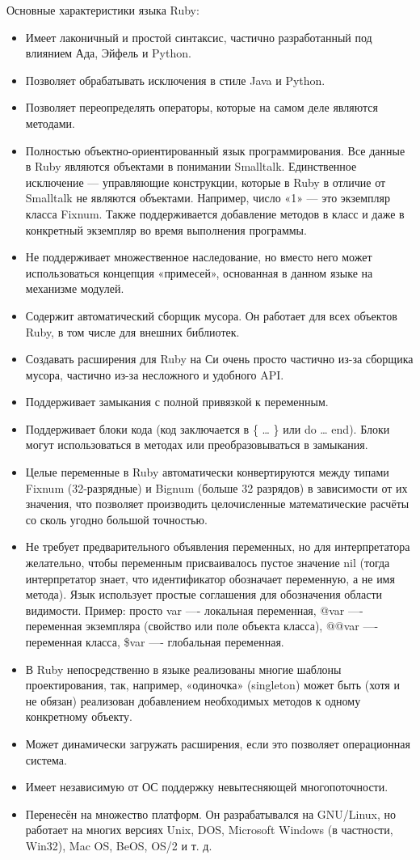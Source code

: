Основные характеристики языка Ruby:
\begin{itemize}
  \item Имеет лаконичный и простой синтаксис, частично разработанный под влиянием Ада, Эйфель и Python.
  \item Позволяет обрабатывать исключения в стиле Java и Python.
  \item Позволяет переопределять операторы, которые на самом деле являются методами.
  \item Полностью объектно-ориентированный язык программирования. Все данные в Ruby являются объектами в понимании Smalltalk. Единственное исключение — управляющие конструкции, которые в Ruby в отличие от Smalltalk не являются объектами. Например, число «1» — это экземпляр класса Fixnum. Также поддерживается добавление методов в класс и даже в конкретный экземпляр во время выполнения программы.
  \item Не поддерживает множественное наследование, но вместо него может использоваться концепция «примесей», основанная в данном языке на механизме модулей.
  \item Содержит автоматический сборщик мусора. Он работает для всех объектов Ruby, в том числе для внешних библиотек.
  \item Создавать расширения для Ruby на Си очень просто частично из-за сборщика мусора, частично из-за несложного и удобного API.
  \item Поддерживает замыкания с полной привязкой к переменным.
  \item Поддерживает блоки кода (код заключается в \{ … \} или do … end). Блоки могут использоваться в методах или преобразовываться в замыкания.
  \item Целые переменные в Ruby автоматически конвертируются между типами Fixnum (32-разрядные) и Bignum (больше 32 разрядов) в зависимости от их значения, что позволяет производить целочисленные математические расчёты со сколь угодно большой точностью.
  \item Не требует предварительного объявления переменных, но для интерпретатора желательно, чтобы переменным присваивалось пустое значение nil (тогда интерпретатор знает, что идентификатор обозначает переменную, а не имя метода). Язык использует простые соглашения для обозначения области видимости. Пример: просто var —- локальная переменная, @var —- переменная экземпляра (свойство или поле объекта класса), @@var —- переменная класса, \$var —- глобальная переменная.
  \item В Ruby непосредственно в языке реализованы многие шаблоны проектирования, так, например, «одиночка» (singleton) может быть (хотя и не обязан) реализован добавлением необходимых методов к одному конкретному объекту.
  \item Может динамически загружать расширения, если это позволяет операционная система.
  \item Имеет независимую от ОС поддержку невытесняющей многопоточности.
  \item Перенесён на множество платформ. Он разрабатывался на GNU/Linux, но работает на многих версиях Unix, DOS, Microsoft Windows (в частности, Win32), Mac OS, BeOS, OS/2 и т. д.
\end{itemize}


